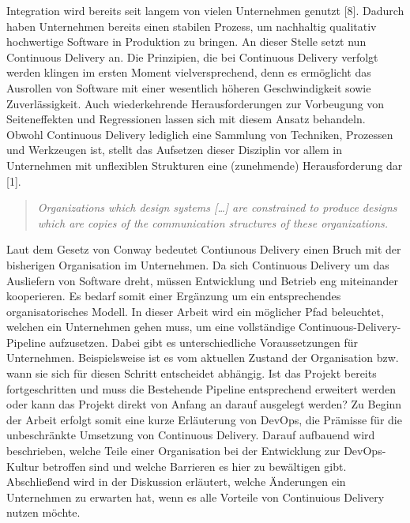 
 Integration wird bereits seit langem von vielen Unternehmen genutzt [8]. Dadurch haben Unternehmen bereits einen stabilen Prozess, um nachhaltig qualitativ hochwertige Software in Produktion zu bringen. An dieser Stelle setzt nun Continuous Delivery an. Die Prinzipien, die bei Continuous Delivery verfolgt werden klingen im ersten Moment vielversprechend, denn es ermöglicht das Ausrollen von Software mit einer wesentlich höheren Geschwindigkeit sowie Zuverlässigkeit. Auch wiederkehrende Herausforderungen zur Vorbeugung von Seiteneffekten und Regressionen lassen sich mit diesem Ansatz behandeln. Obwohl Continuous Delivery lediglich eine Sammlung von Techniken, Prozessen und Werkzeugen ist, stellt das Aufsetzen dieser Disziplin vor allem in Unternehmen mit unflexiblen Strukturen eine (zunehmende) Herausforderung dar [1]. 

\begin{quote} \textit{\glqq Organizations which design systems […] are constrained to produce designs which are copies of the communication structures of these organizations. \grqq~}\cite[S.5]{Farley.2011} \end{quote} 

Laut dem Gesetz von Conway bedeutet Contiunous Delivery einen Bruch mit der bisherigen Organisation im Unternehmen. Da sich Continuous Delivery um das Ausliefern von Software dreht, müssen Entwicklung und Betrieb eng miteinander kooperieren. Es bedarf somit einer Ergänzung um ein entsprechendes organisatorisches Modell. In dieser Arbeit wird ein möglicher Pfad beleuchtet, welchen ein Unternehmen gehen muss, um eine vollständige Continuous-Delivery-Pipeline aufzusetzen. Dabei gibt es unterschiedliche Voraussetzungen für Unternehmen. Beispielsweise ist es vom aktuellen Zustand der Organisation bzw. wann sie sich für diesen Schritt entscheidet abhängig. Ist das Projekt bereits fortgeschritten und muss die Bestehende Pipeline entsprechend erweitert werden oder kann das Projekt direkt von Anfang an darauf ausgelegt werden? Zu Beginn der Arbeit erfolgt somit eine kurze Erläuterung von DevOps, die Prämisse für die unbeschränkte Umsetzung von Continuous Delivery. Darauf aufbauend wird beschrieben, welche Teile einer Organisation bei der Entwicklung zur DevOps-Kultur betroffen sind und welche Barrieren es hier zu bewältigen gibt. Abschließend wird in der Diskussion erläutert, welche Änderungen ein Unternehmen zu erwarten hat, wenn es alle Vorteile von Continuious Delivery nutzen möchte.
